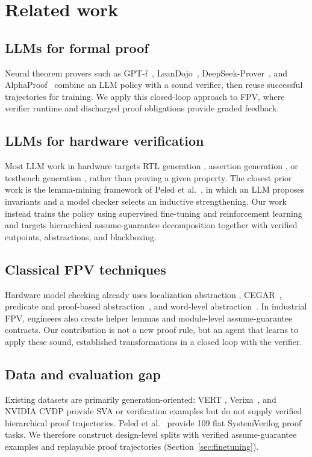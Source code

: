 \section{Related work}

\subsection{LLMs for formal proof}

Neural theorem provers such as GPT-f~\cite{polu2020gptf},
LeanDojo~\cite{yang2023leandojo}, DeepSeek-Prover~\cite{xin2024deepseekproverv15,ren2025deepseekproverv2},
and AlphaProof~\cite{deepmind2024alphaproof} combine an LLM policy with a
sound verifier, then reuse successful trajectories for training. We apply
this closed-loop approach to FPV, where verifier runtime and discharged proof
obligations provide graded feedback.

\subsection{LLMs for hardware verification}

Most LLM work in hardware targets RTL generation
\cite{liu2023verilogeval,liu2024rtlcoder}, assertion generation
\cite{fang2025assertllm,mali2024chiraag}, or testbench generation
\cite{qiu2024autobench}, rather than proving a given property. The closest
prior work is the lemma-mining framework of Peled et
al.~\cite{peled2026lemmaminers}, in which an LLM proposes invariants and a
model checker selects an inductive strengthening. Our work instead trains the
policy using supervised fine-tuning and reinforcement learning and targets
hierarchical assume-guarantee decomposition together with verified cutpoints,
abstractions, and blackboxing.

\subsection{Classical FPV techniques}

Hardware model checking already uses localization abstraction
\cite{kurshan1994localization}, CEGAR~\cite{clarke2000cegar}, predicate and
proof-based abstraction~\cite{graf1997predicate,mcmillan2003proofbased}, and
word-level abstraction~\cite{goel2020avr,mann2021pono}. In industrial FPV,
engineers also create helper lemmas and module-level
assume-guarantee contracts. Our contribution is not a new proof rule, but an
agent that learns to apply these sound, established transformations in a
closed loop with the verifier.

\subsection{Data and evaluation gap}

Existing datasets are primarily generation-oriented: VERT
\cite{menon2025vert}, Verixa~\cite{verixa2025}, and NVIDIA CVDP
\cite{nvidiacvdp2025} provide SVA or verification examples but do not supply
verified hierarchical proof trajectories. Peled et
al.~\cite{peled2026lemmaminers} provide 109 flat SystemVerilog proof tasks.
We therefore construct design-level splits with verified assume-guarantee
examples and replayable proof trajectories (Section~\ref{sec:finetuning}).
